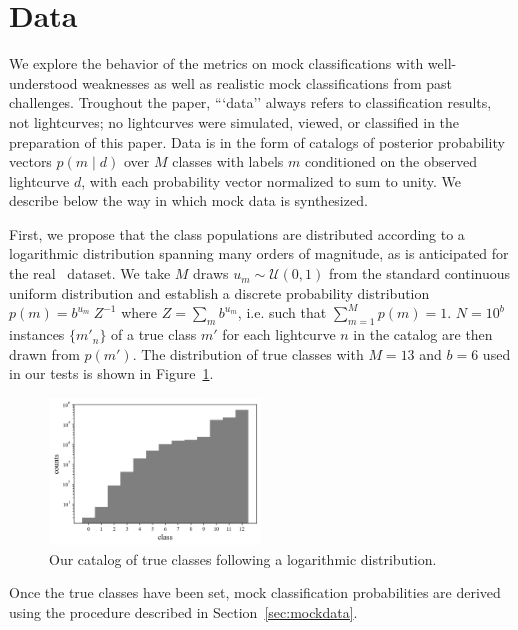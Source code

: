 \section{Data}
\label{sec:data}

We explore the behavior of the metrics on mock classifications with well-understood weaknesses as well as realistic mock classifications from past challenges.
Troughout the paper, ```data'' always refers to classification results, not lightcurves; no lightcurves were simulated, viewed, or classified in the preparation of this paper.
Data is in the form of catalogs of posterior probability vectors $p(m \mid d)$ over $M$ classes with labels $m$ conditioned on the observed lightcurve $d$, with each probability vector normalized to sum to unity.
We describe below the way in which mock data is synthesized.

First, we propose that the class populations are distributed according to a logarithmic distribution spanning many orders of magnitude, as is anticipated for the real \lsst\ dataset.
We take $M$ draws $u_{m} \sim \mathcal{U}(0, 1)$ from the standard continuous uniform distribution and establish a discrete probability distribution $p(m) = b^{u_{m}}\ Z^{-1}$ where $Z = \sum_{m} b^{u_{m}}$, i.e. such that $\sum_{m=1}^{M} p(m) = 1$.
$N = 10^{b}$ instances $\{m'_{n}\}$ of a true class $m'$ for each lightcurve $n$ in the catalog are then drawn from $p(m')$.
The distribution of true classes with $M = 13$ and $b = 6$ used in our tests is shown in Figure~\ref{fig:classdist}.

\begin{figure}
	\begin{center}
    \includegraphics[width=0.5\textwidth]{./fig/complete_counts.png}
		\caption{Our catalog of true classes following a logarithmic distribution.}
		\label{fig:classdist}
	\end{center}
\end{figure}

Once the true classes have been set, mock classification probabilities are derived using the procedure described in Section~\ref{sec:mockdata}.

